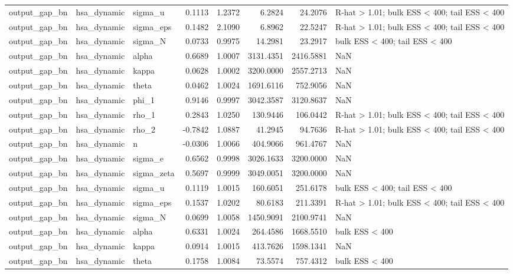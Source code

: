 \begin{tabular}{lllrrrrl}
output\_gap\_bn & hsa\_dynamic & sigma\_u & 0.1113 & 1.2372 & 6.2824 & 24.2076 & R-hat > 1.01; bulk ESS < 400; tail ESS < 400 \\
output\_gap\_bn & hsa\_dynamic & sigma\_eps & 0.1482 & 2.1090 & 6.8962 & 22.5247 & R-hat > 1.01; bulk ESS < 400; tail ESS < 400 \\
output\_gap\_bn & hsa\_dynamic & sigma\_N & 0.0733 & 0.9975 & 14.2981 & 23.2917 & bulk ESS < 400; tail ESS < 400 \\
output\_gap\_bn & hsa\_dynamic & alpha & 0.6689 & 1.0007 & 3131.4351 & 2416.5881 & NaN \\
output\_gap\_bn & hsa\_dynamic & kappa & 0.0628 & 1.0002 & 3200.0000 & 2557.2713 & NaN \\
output\_gap\_bn & hsa\_dynamic & theta & 0.0462 & 1.0024 & 1691.6116 & 752.9056 & NaN \\
output\_gap\_bn & hsa\_dynamic & phi\_1 & 0.9146 & 0.9997 & 3042.3587 & 3120.8637 & NaN \\
output\_gap\_bn & hsa\_dynamic & rho\_1 & 0.2843 & 1.0250 & 130.9446 & 106.0442 & R-hat > 1.01; bulk ESS < 400; tail ESS < 400 \\
output\_gap\_bn & hsa\_dynamic & rho\_2 & -0.7842 & 1.0887 & 41.2945 & 94.7636 & R-hat > 1.01; bulk ESS < 400; tail ESS < 400 \\
output\_gap\_bn & hsa\_dynamic & n & -0.0306 & 1.0066 & 404.9066 & 961.4767 & NaN \\
output\_gap\_bn & hsa\_dynamic & sigma\_e & 0.6562 & 0.9998 & 3026.1633 & 3200.0000 & NaN \\
output\_gap\_bn & hsa\_dynamic & sigma\_zeta & 0.5697 & 0.9999 & 3049.0051 & 3200.0000 & NaN \\
output\_gap\_bn & hsa\_dynamic & sigma\_u & 0.1119 & 1.0015 & 160.6051 & 251.6178 & bulk ESS < 400; tail ESS < 400 \\
output\_gap\_bn & hsa\_dynamic & sigma\_eps & 0.1537 & 1.0202 & 80.6183 & 211.3391 & R-hat > 1.01; bulk ESS < 400; tail ESS < 400 \\
output\_gap\_bn & hsa\_dynamic & sigma\_N & 0.0699 & 1.0058 & 1450.9091 & 2100.9741 & NaN \\
output\_gap\_bn & hsa\_dynamic & alpha & 0.6331 & 1.0024 & 264.4586 & 1668.5510 & bulk ESS < 400 \\
output\_gap\_bn & hsa\_dynamic & kappa & 0.0914 & 1.0015 & 413.7626 & 1598.1341 & NaN \\
output\_gap\_bn & hsa\_dynamic & theta & 0.1758 & 1.0084 & 73.5574 & 757.4312 & bulk ESS < 400 \\

\end{tabular}
